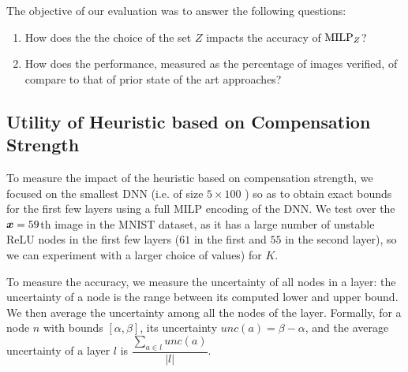 The  objective of our evaluation was to answer the following  questions:

\begin{enumerate}
	\item How does the the choice of  the set  $Z$ impacts the accuracy of ${\textrm{MILP}}_Z$? 
	\item  How does the performance, measured as the percentage of images verified, of \toolname compare to that of prior state of the art approaches? 
\end{enumerate}

\subsection{Utility of Heuristic based on Compensation Strength  }

To measure the impact of the heuristic based on compensation strength, we focused on the smallest DNN (i.e. of size $5\times 100$ \cite{crown}) so as to obtain exact bounds for the first few layers using a full MILP encoding of the DNN. We test over the $\boldsymbol{x}=59$th image in the MNIST dataset, as it has a large number of unstable ReLU nodes in the first few layers ($61$ in the first and $55$ in the second layer), so we can experiment with a larger choice of values) for $K$.

To measure the accuracy, we measure the uncertainty of all nodes in a layer:
the uncertainty of a node is the range between its computed lower and upper bound. 
We then average the uncertainty among all the nodes of the layer.
Formally, for a node $n$ with bounds $[\alpha,\beta]$, its uncertainty $unc(a) = \beta - \alpha$, and the average uncertainty of a layer $l$ is $\dfrac{\sum_{a\in l} unc(a)}{|l|}.$










